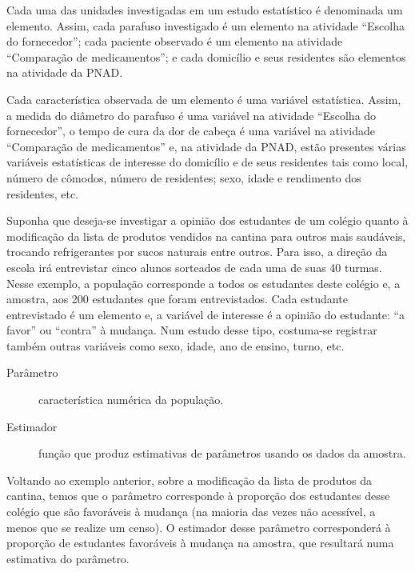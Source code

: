 Cada uma das unidades investigadas em um estudo estatístico é denominada um elemento.  Assim, cada parafuso investigado é um elemento na atividade ``Escolha do fornecedor''; cada paciente observado é um elemento na atividade ``Comparação de medicamentos''; e cada domicílio e seus residentes são elementos na atividade da PNAD.

Cada característica observada de um elemento é uma variável estatística. Assim, a medida do diâmetro do parafuso é uma variável na atividade ``Escolha do fornecedor'', o tempo de cura da dor de cabeça é uma variável na atividade ``Comparação de medicamentos'' e, na atividade da PNAD, estão presentes várias variáveis estatísticas de interesse do domicílio e de seus residentes tais como local, número de cômodos, número de residentes; sexo, idade e rendimento dos residentes, etc.

Suponha que deseja-se investigar a opinião dos estudantes de um colégio quanto à modificação da lista de produtos vendidos na cantina para outros mais saudáveis, trocando refrigerantes por sucos naturais entre outros. Para isso, a direção da escola irá entrevistar cinco alunos sorteados de cada uma de suas 40 turmas. Nesse exemplo, a população corresponde a todos os estudantes deste colégio e, a amostra, aos 200 estudantes que foram entrevistados. Cada estudante entrevistado é um elemento e, a variável de interesse  é a opinião do estudante: ``a favor'' ou ``contra'' à mudança. Num estudo desse tipo, costuma-se registrar também outras variáveis como sexo, idade, ano de ensino, turno, etc.
\begin{description}
\item[{Parâmetro}] \leavevmode{}\label{\detokenize{PE103-1:term-parametro}}
característica numérica da população.

\end{description}
\begin{description}
\item[{Estimador}] \leavevmode{}\label{\detokenize{PE103-1:term-estimador}}
função que produz estimativas de parâmetros usando os dados da amostra.

\end{description}

Voltando ao exemplo anterior, sobre a modificação da lista de produtos da cantina, temos que o parâmetro corresponde à proporção dos estudantes desse colégio que são favoráveis à mudança (na maioria das vezes não acessível, a menos que se realize um censo). O estimador desse parâmetro corresponderá à proporção de estudantes favoráveis à mudança na amostra, que resultará numa estimativa do parâmetro.

